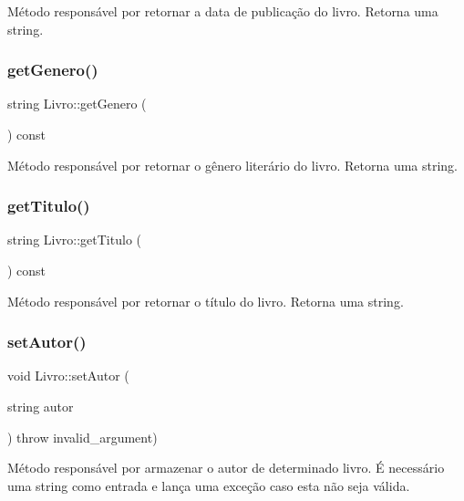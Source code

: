 Método responsável por retornar a data de publicação do livro. Retorna uma string. \mbox{\label{classLivro_a00b6085b059571efab6d29630cf95a50}} 
\subsubsection{\texorpdfstring{get\+Genero()}{getGenero()}}
{\footnotesize\ttfamily string Livro\+::get\+Genero (\begin{DoxyParamCaption}{ }\end{DoxyParamCaption}) const\hspace{0.3cm}{\ttfamily [inline]}}

Método responsável por retornar o gênero literário do livro. Retorna uma string. \mbox{\label{classLivro_a4b4e2e74d4fa1a0e6e9a4d6c05dc3bd4}} 
\subsubsection{\texorpdfstring{get\+Titulo()}{getTitulo()}}
{\footnotesize\ttfamily string Livro\+::get\+Titulo (\begin{DoxyParamCaption}{ }\end{DoxyParamCaption}) const\hspace{0.3cm}{\ttfamily [inline]}}

Método responsável por retornar o título do livro. Retorna uma string. \mbox{\label{classLivro_ab6979584fef48cc9b2ca4dc0359dd69d}} 
\subsubsection{\texorpdfstring{set\+Autor()}{setAutor()}}
{\footnotesize\ttfamily void Livro\+::set\+Autor (\begin{DoxyParamCaption}\item[{string}]{autor }\end{DoxyParamCaption}) throw  invalid\+\_\+argument) \hspace{0.3cm}{\ttfamily [inline]}}

Método responsável por armazenar o autor de determinado livro. É necessário uma string como entrada e lança uma exceção caso esta não seja válida. \mbox{\label{classLivro_a814d21b9fc0e35f974fcd7739082ea58}} 
